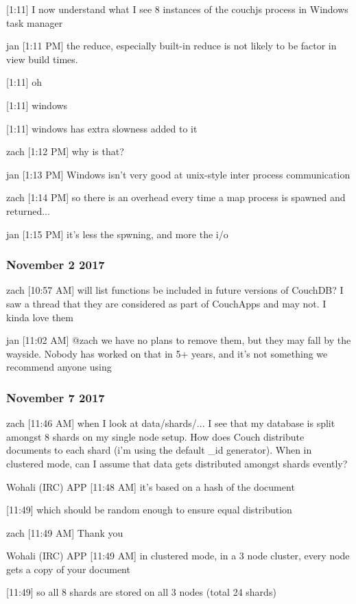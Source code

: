 [1:11]
I now understand what I see 8 instances of the couchjs process in Windows task manager

jan [1:11 PM]
the reduce, especially built-in reduce is not likely to be factor in view build times.

[1:11]
oh

    [1:11]
windows

    [1:11]
windows has extra slowness added to it

zach [1:12 PM]
why is that?

jan [1:13 PM]
Windows isn’t very good at unix-style inter process communication

zach [1:14 PM]
so there is an overhead every time a map process is spawned and returned...

jan [1:15 PM]
it’s less the spwning, and more the i/o

\subsubsection{November 2 2017}
\label{slack-2-nov}
zach [10:57 AM]
will list functions be included in future versions of CouchDB? I saw a thread that they are considered as part of CouchApps and may not. I kinda love them

jan [11:02 AM]
@zach we have no plans to remove them, but they may fall by the wayside. Nobody has worked on that in 5+ years, and it’s not something we recommend anyone using

\subsubsection{November 7 2017}
\label{slack-7-nov}
zach [11:46 AM]
when I look at data/shards/... I see that my database is split amongst 8 shards on my single node setup. How does Couch distribute documents to each shard (i'm using the default \_id generator). When in clustered mode, can I assume that data gets distributed amongst shards evently?

Wohali (IRC) APP [11:48 AM]
it's based on a hash of the document

[11:49]
which should be random enough to ensure equal distribution

zach [11:49 AM]
Thank you

Wohali (IRC) APP [11:49 AM]
in clustered mode, in a 3 node cluster, every node gets a copy of your document

[11:49]
so all 8 shards are stored on all 3 nodes (total 24 shards)

